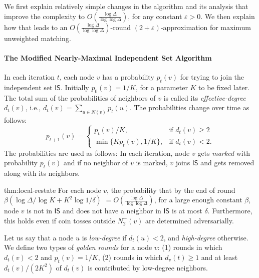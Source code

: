 \documentclass[11pt]{article}
\newcommand{\eps}{\varepsilon}
\newenvironment{theorem-repeat}[1]{\begin{trivlist}
\item[\hspace{\labelsep}{\bf\noindent Theorem \ref{#1} }]\em }%
{\end{trivlist}}
\begin{document}
We first explain relatively simple changes in the algorithm and its analysis that improve the complexity to $O(\frac{\log \Delta}{\log\log \Delta})$, for any constant $\eps>0$. We then explain how that leads to an $O(\frac{\log \Delta}{\log\log \Delta})$-round $(2+\eps)$-approximation for maximum unweighted matching.\\

\begin{mdframed}[hidealllines=false,backgroundcolor=gray!30]
\paragraph{The Modified Nearly-Maximal Independent Set Algorithm}
In each iteration $t$, each node $v$ has a probability $p_t(v)$ for trying to join the independent set $\mathsf{IS}$. Initially $p_0(v)=1/K$, for a parameter $K$ to be fixed later. The total sum of the probabilities of neighbors of $v$ is called its \emph{effective-degree} $d_{t}(v)$, i.e., $d_t(v)=\sum_{u \in N(v)} p_{t}(u)$. The probabilities change over time as follows: $$p_{t+1}(v)=
\begin{cases}
    p_{t}(v)/K, & \text{if } d_{t}(v)\geq 2\\
    \min\{Kp_{t}(v), 1/K\},  &\text{if } d_{t}(v)< 2.
\end{cases}
$$
The probabilities are used as follows: In each iteration, node $v$ gets \emph{marked} with probability $p_{t}(v)$ and if no neighbor of $v$ is marked, $v$ joins $\mathsf{IS}$ and gets removed along with its neighbors.
\end{mdframed}



\begin{theorem-repeat}{thm:local-restate} 
For each node $v$, the probability that by the end of round $\beta(\log \Delta/\log K + K^2 \log 1/\delta)$ $=O(\frac{\log \Delta}{\log\log \Delta})$, for a large enough constant $\beta$, node $v$ is not in $\mathsf{IS}$ and does not have a neighbor in $\mathsf{IS}$ is at most $\delta$. Furthermore, this holds even if coin tosses outside $N^{+}_{2}(v)$ are determined adversarially.
\end{theorem-repeat}
Let us say that a node $u$ is \emph{low-degree} if $d_t(u)<2$, and \emph{high-degree} otherwise. We define two types of \emph{golden rounds} for a node $v$: (1) rounds in which $d_t(v)<2$ and $p_{t}(v)= 1/K$, (2) rounds in which $d_{v}(t)\geq 1$ and at least $d_{t}(v)/(2K^2)$ of $d_{t}(v)$ is contributed by low-degree neighbors.
\end{document}
